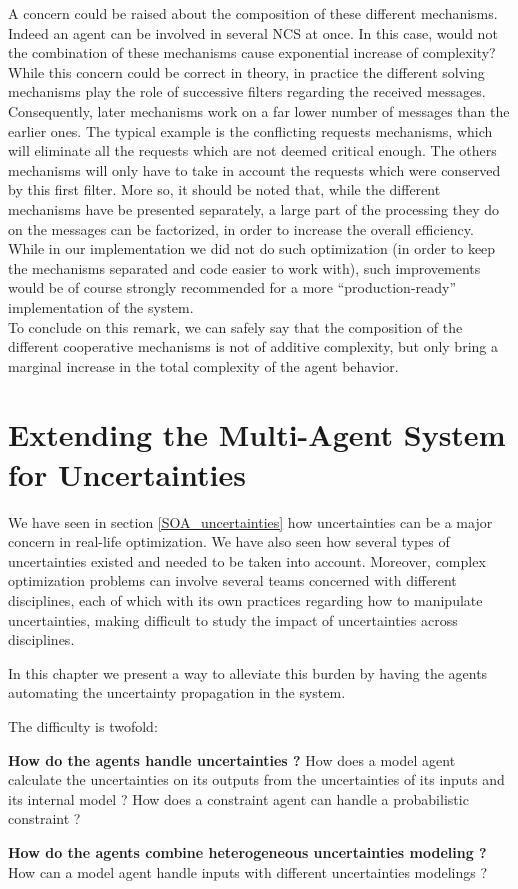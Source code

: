 A concern could be raised about the composition of these different mechanisms. Indeed an agent can be involved in several NCS at once. In this case, would not the combination of these mechanisms cause exponential increase of complexity? While this concern could be correct in theory, in practice the different solving mechanisms play the role of successive filters regarding the received messages. Consequently, later mechanisms work on a far lower number of messages than the earlier ones. The typical example is the conflicting requests mechanisms, which will eliminate all the requests which are not deemed critical enough. The others mechanisms will only have to take in account the requests which were conserved by this first filter. More so, it should be noted that, while the different mechanisms have be presented separately, a large part of the processing they do on the messages can be factorized, in order to increase the overall efficiency. While in our implementation we did not do such optimization (in order to keep the mechanisms separated and code easier to work with), such improvements would be of course strongly recommended for a more \enquote{production-ready} implementation of the system.\\
To conclude on this remark, we can safely say that the composition of the different cooperative mechanisms is not of additive complexity, but only bring a marginal increase in the total complexity of the agent behavior.

\chapter{Extending the Multi-Agent System for Uncertainties}

We have seen in section \ref{SOA_uncertainties} how uncertainties can be a major concern in real-life optimization. We have also seen how several types of uncertainties existed and needed to be taken into account. Moreover, complex optimization problems can involve several teams concerned with different disciplines, each of which with its own practices regarding how to manipulate uncertainties, making difficult to study the impact of uncertainties across disciplines.

In this chapter we present a way to alleviate this burden by having the agents automating the uncertainty propagation in the system.

The difficulty is twofold:
\begin{compactitem}
\item \textbf{How do the agents handle uncertainties ?}
How does a model agent calculate the uncertainties on its outputs from the uncertainties of its inputs and its internal model ? How does a constraint agent can handle a probabilistic constraint ?

\item \textbf{How do the agents combine heterogeneous uncertainties modeling ?}
How can a model agent handle inputs with different uncertainties modelings ?
\end{compactitem}

